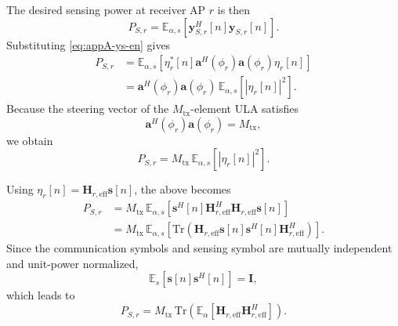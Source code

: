 \documentclass[conference,twocolumn,a4paper]{IEEEtran}
\begin{document}
The desired sensing power at receiver AP $r$ is then
\begin{equation}
P_{S,r}=\mathbb{E}_{\alpha,s}\!\left[\mathbf{y}_{S,r}^H[n]\mathbf{y}_{S,r}[n]\right].
\label{eq:appA-ps1-en}
\end{equation}
Substituting \eqref{eq:appA-ys-en} gives
\begin{align}
P_{S,r}
&=\mathbb{E}_{\alpha,s}\!\left[\eta_r^*[n] \mathbf{a}^H(\phi_r)\mathbf{a}(\phi_r) \eta_r[n]\right] \nonumber\\
&=\mathbf{a}^H(\phi_r)\mathbf{a}(\phi_r)\,\mathbb{E}_{\alpha,s}\!\left[|\eta_r[n]|^2\right].
\label{eq:appA-ps2-en}
\end{align}
Because the steering vector of the $M_{\mathrm{tx}}$-element ULA satisfies
\begin{equation}
\mathbf{a}^H(\phi_r)\mathbf{a}(\phi_r)=M_{\mathrm{tx}},
\label{eq:appA-arraynorm-en}
\end{equation}
we obtain
\begin{equation}
P_{S,r}=M_{\mathrm{tx}}\,\mathbb{E}_{\alpha,s}\!\left[|\eta_r[n]|^2\right].
\label{eq:appA-ps3-en}
\end{equation}

Using $\eta_r[n]=\mathbf{H}_{r,\mathrm{eff}}\mathbf{s}[n]$, the above becomes
\begin{align}
P_{S,r}
&=M_{\mathrm{tx}}\,\mathbb{E}_{\alpha,s}\!\left[\mathbf{s}^H[n]\mathbf{H}_{r,\mathrm{eff}}^H\mathbf{H}_{r,\mathrm{eff}}\mathbf{s}[n]\right] \nonumber\\
&=M_{\mathrm{tx}}\,\mathbb{E}_{\alpha,s}\!\left[\mathrm{Tr}\!\left(\mathbf{H}_{r,\mathrm{eff}}\mathbf{s}[n]\mathbf{s}^H[n]\mathbf{H}_{r,\mathrm{eff}}^H\right)\right].
\label{eq:appA-ps4-en}
\end{align}
Since the communication symbols and sensing symbol are mutually independent and unit-power normalized,
\begin{equation}
\mathbb{E}_{s}\!\left[\mathbf{s}[n]\mathbf{s}^H[n]\right]=\mathbf{I},
\label{eq:appA-ss-en}
\end{equation}
which leads to
\begin{equation}
P_{S,r}=M_{\mathrm{tx}}\,\mathrm{Tr}\!\left(\mathbb{E}_{\alpha}\!\left[\mathbf{H}_{r,\mathrm{eff}}\mathbf{H}_{r,\mathrm{eff}}^H\right]\right).
\label{eq:appA-ps5-en}
\end{equation}
\end{document}
